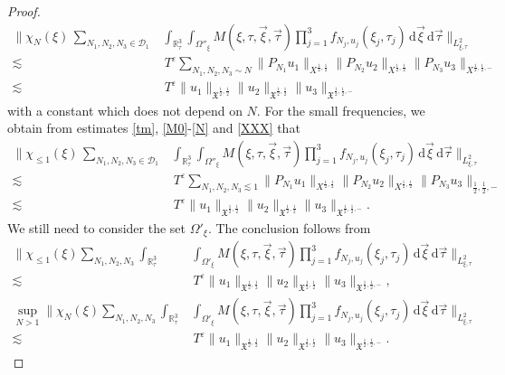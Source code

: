 \documentclass[reqno]{amsart}
\theoremstyle{Definitionl}
\theoremstyle{Definitionk}
\theoremstyle{definition}
\theoremstyle{Satzk}
\theoremstyle{Satzl}
\theoremstyle{Bemerkung}
\begin{document}
\begin{proof}
\begin{align*}
\Big\|\chi_N(\xi)\,\sum_{N_1,N_2,N_3\in\mathcal D_1}&\int_{\mathbb R^3_\tau}\int_{\Omega''_\xi}M(\xi,\tau,\vec\xi,\vec\tau)\prod_{j=1}^3f_{N_j,u_j}(\xi_j,\tau_j)\,\mathrm d\vec\xi\,\mathrm d\vec\tau\Big\|_{L^2_{\xi,\tau}}\nonumber\\
\lesssim&\, T^\varepsilon \sum_{N_1,N_2,N_3\sim N}\|P_{N_1}u_1\|_{X^{\frac12,\frac12}}\|P_{N_2}u_2\|_{X^{\frac12,\frac12}}\|P_{N_3}u_3\|_{X^{\frac12,\frac12,-}}\nonumber\\
\lesssim&\, T^\varepsilon \|u_1\|_{\mathfrak X^{\frac12,\frac12}}\|u_2\|_{\mathfrak X^{\frac12,\frac12}}\|u_3\|_{\mathfrak X^{\frac12,\frac12,-}}
\end{align*}
with a constant which does not depend on $N$. For the small frequencies, we obtain from estimates \eqref{tm}, \eqref{M0}-\eqref{N} and \eqref{XXX} that
\begin{align*}
\Big\|\chi_{\le1}(\xi)\,\sum_{N_1,N_2,N_3\in\mathcal D_1}&\int_{\mathbb R^3_\tau}\int_{\Omega''_\xi}M(\xi,\tau,\vec\xi,\vec\tau)\prod_{j=1}^3f_{N_j,u_j}(\xi_j,\tau_j)\,\mathrm d\vec\xi\,\mathrm d\vec\tau\Big\|_{L^2_{\xi,\tau}}\nonumber\\
\lesssim&\, T^\varepsilon\sum_{N_1,N_2,N_3\lesssim1}\|P_{N_1}u_1\|_{X^{\frac12,\frac12}}\|P_{N_2}u_2\|_{X^{\frac12,\frac12}}\|P_{N_3}u_3\|_{\frac12,\frac12,-}\nonumber\\
\lesssim&\, T^\varepsilon\|u_1\|_{\mathfrak X^{\frac12,\frac12}}\|u_2\|_{\mathfrak X^{\frac12,\frac12}}\|u_3\|_{\mathfrak X^{\frac12,\frac12,-}}.
\end{align*}
We still need to consider the set $\Omega'_\xi$. The conclusion follows from
\begin{align}
\Big\|\chi_{\le1}(\xi)\sum_{N_1,N_2,N_3}\int_{\mathbb R^3_\tau}&\int_{\Omega'_\xi}M(\xi,\tau,\vec\xi,\vec\tau)\prod_{j=1}^3f_{N_j,u_j}(\xi_j,\tau_j)\,\mathrm d\vec\xi\,\mathrm d\vec\tau\Big\|_{L^2_{\xi,\tau}}\nonumber\\
\lesssim&\, T^\varepsilon\|u_1\|_{\mathfrak X^{\frac12,\frac12}}\|u_2\|_{\mathfrak X^{\frac12,\frac12}}\|u_3\|_{\mathfrak X^{\frac12,\frac12,-}},\label{AAA}\\
\sup_{N>1}\Big\|\chi_N(\xi)\sum_{N_1,N_2,N_3}\int_{\mathbb R^3_\tau}&\int_{\Omega'_\xi}M(\xi,\tau,\vec\xi,\vec\tau)\prod_{j=1}^3f_{N_j,u_j}(\xi_j,\tau_j)\,\mathrm d\vec\xi\,\mathrm d\vec\tau\Big\|_{L^2_{\xi,\tau}}\nonumber\\
\lesssim&\, T^\varepsilon\|u_1\|_{\mathfrak X^{\frac12,\frac12}}\|u_2\|_{\mathfrak X^{\frac12,\frac12}}\|u_3\|_{\mathfrak X^{\frac12,\frac12,-}}\label{BBB}.\end{align}

\end{proof}
\end{document}
